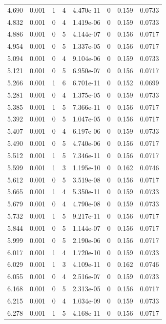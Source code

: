\documentclass[preview]{standalone}
\begin{document}
{{{\begin{tabular}{L{1.2cm}C{1.2cm} C{0.3cm}C{0.5cm} C{1.4cm}C{1.4cm} C{1.4cm}C{1.4cm}}
  4.690  &  0.001  & 1     &  4 &  4.470e-11  & 0  & 0.159 &  0.0733   \\ 
  4.832  &  0.001  & 0     &  4 &  1.419e-06  & 0  & 0.159 &  0.0733   \\ 
  4.886  &  0.001  & 0     &  5 &  4.144e-07  & 0  & 0.156 &  0.0717   \\ 
  4.954  &  0.001  & 0     &  5 &  1.337e-05  & 0  & 0.156 &  0.0717   \\ 
  5.094  &  0.001  & 0     &  4 &  9.104e-06  & 0  & 0.159 &  0.0733   \\ 
  5.121  &  0.001  & 0     &  5 &  6.950e-07  & 0  & 0.156 &  0.0717   \\ 
  5.266  &  0.001  & 1     &  6 &  6.701e-11  & 0  & 0.152 &  0.0699   \\ 
  5.281  &  0.001  & 0     &  4 &  1.375e-05  & 0  & 0.159 &  0.0733   \\ 
  5.385  &  0.001  & 1     &  5 &  7.366e-11  & 0  & 0.156 &  0.0717   \\ 
  5.392  &  0.001  & 0     &  5 &  1.047e-05  & 0  & 0.156 &  0.0717   \\ 
  5.407  &  0.001  & 0     &  4 &  6.197e-06  & 0  & 0.159 &  0.0733   \\ 
  5.490  &  0.001  & 0     &  5 &  4.740e-06  & 0  & 0.156 &  0.0717   \\ 
  5.512  &  0.001  & 1     &  5 &  7.346e-11  & 0  & 0.156 &  0.0717   \\ 
  5.599  &  0.001  & 1     &  3 &  1.195e-10  & 0  & 0.162 &  0.0746   \\ 
  5.612  &  0.001  & 0     &  5 &  3.519e-08  & 0  & 0.156 &  0.0717   \\ 
  5.665  &  0.001  & 1     &  4 &  5.350e-11  & 0  & 0.159 &  0.0733   \\ 
  5.679  &  0.001  & 0     &  4 &  4.790e-08  & 0  & 0.159 &  0.0733   \\ 
  5.732  &  0.001  & 1     &  5 &  9.217e-11  & 0  & 0.156 &  0.0717   \\ 
  5.844  &  0.001  & 0     &  5 &  1.144e-07  & 0  & 0.156 &  0.0717   \\ 
  5.999  &  0.001  & 0     &  5 &  2.190e-06  & 0  & 0.156 &  0.0717   \\ 
  6.017  &  0.001  & 1     &  4 &  1.720e-10  & 0  & 0.159 &  0.0733   \\ 
  6.029  &  0.001  & 1     &  3 &  4.109e-11  & 0  & 0.162 &  0.0746   \\ 
  6.055  &  0.001  & 0     &  4 &  2.516e-07  & 0  & 0.159 &  0.0733   \\ 
  6.168  &  0.001  & 0     &  5 &  2.313e-05  & 0  & 0.156 &  0.0717   \\ 
  6.215  &  0.001  & 0     &  4 &  1.034e-09  & 0  & 0.159 &  0.0733   \\ 
  6.278  &  0.001  & 1     &  5 &  4.168e-11  & 0  & 0.156 &  0.0717   \\ 
\hline 
\end{tabular} 

}}}
\end{document}
